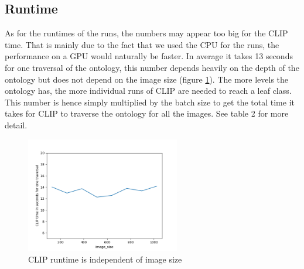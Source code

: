 \documentclass[a4paper,11pt,oneside]{article}
\begin{document}
  \subsection{Runtime}
  As for the runtimes of the runs, the numbers may appear too big for the CLIP time. That is mainly due to the fact that we used the CPU for the runs, the performance on a GPU would naturally be faster. In average it takes 13 seconds for one traversal of the ontology, this number depends heavily on the depth of the ontology but does not depend on the image size (figure \ref{fig:fig1}). The more levels the ontology has, the more individual runs of CLIP are needed to reach a leaf class. This number is hence simply multiplied by the batch size to get the total time it takes for CLIP to traverse the ontology for all the images. See table 2 for more detail.
  \begin{figure}[h]
  	\centering
  	\includegraphics[width=0.6\textwidth]{figures/fig1.png}
  	\caption{CLIP runtime is independent of image size}
  	\label{fig:fig1}
  \end{figure}
  
\end{document}
